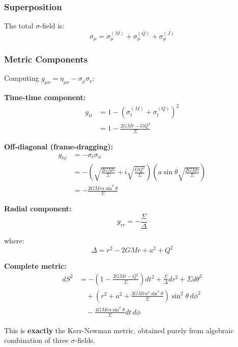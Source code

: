 \documentclass[11pt,a4paper]{article}
\theoremstyle{definition}
\theoremstyle{remark}
\begin{document}
	\subsubsection{Superposition}
	
	The total $\sigma$-field is:
	\begin{equation}
		\sigma_\mu = \sigma_\mu^{(M)} + \sigma_\mu^{(Q)} + \sigma_\mu^{(J)}
	\end{equation}
	
	\subsubsection{Metric Components}
	
	Computing $g_{\mu\nu} = \eta_{\mu\nu} - \sigma_\mu\sigma_\nu$:
	
	\textbf{Time-time component:}
	\begin{align}
		g_{tt} &= 1 - (\sigma_t^{(M)} + \sigma_t^{(Q)})^2 \\
		&= 1 - \frac{2GMr - GQ^2}{\Sigma}
	\end{align}
	
	\textbf{Off-diagonal (frame-dragging):}
	\begin{align}
		g_{t\phi} &= -\sigma_t \sigma_\phi \\
		&= -\left(\sqrt{\frac{2GMr}{\Sigma}} + i\sqrt{\frac{GQ^2}{\Sigma}}\right) \left(a\sin\theta\sqrt{\frac{2GMr}{\Sigma}}\right) \\
		&= -\frac{2GMra\sin^2\theta}{\Sigma}
	\end{align}
	
	\textbf{Radial component:}
	\begin{equation}
		g_{rr} = -\frac{\Sigma}{\Delta}
	\end{equation}
	
	where:
	\begin{equation}
		\Delta = r^2 - 2GMr + a^2 + Q^2
	\end{equation}
	
	\textbf{Complete metric:}
	\begin{align}
		dS^2 &= -\left(1-\frac{2GMr-Q^2}{\Sigma}\right)dt^2 + \frac{\Sigma}{\Delta}dr^2 + \Sigma d\theta^2 \nonumber \\
		&\quad + \left(r^2+a^2+\frac{2GMra^2\sin^2\theta}{\Sigma}\right)\sin^2\theta \, d\phi^2 \nonumber \\
		&\quad - \frac{4GMra\sin^2\theta}{\Sigma} dt\,d\phi
		\label{eq:kerr_newman_full}
	\end{align}
	
	This is \textbf{exactly} the Kerr-Newman metric, obtained purely from algebraic combination of three $\sigma$-fields.
	
\end{document}
